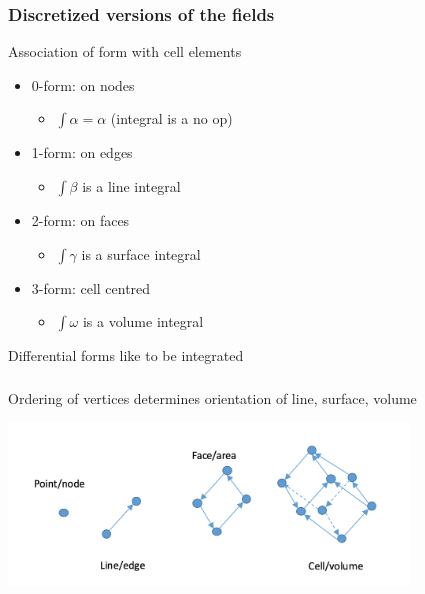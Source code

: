 \documentclass[aspectratio=169]{beamer}
\begin{document}
\begin{frame}[t]
  \frametitle{Discretized versions of the fields}
    \begin{block}{Association of form with cell elements}
      \begin{itemize}%
	  \item 0-form: {\color{red} on nodes}
        \begin{itemize}
          \item $\int \alpha = \alpha$ (integral is a no op)
        \end{itemize}
      \item 1-form: {\color{red} on edges}
        \begin{itemize}
          \item $\int \beta$ is a line integral
        \end{itemize}
      \item 2-form: {\color{red} on faces}
        \begin{itemize}
          \item $\int \gamma$ is a surface integral
        \end{itemize}
      \item 3-form: {\color{red} cell centred}
        \begin{itemize}
          \item $\int \omega$ is a volume integral
        \end{itemize}
    \end{itemize}
  \end{block}
  \begin{block}{Differential forms like to be integrated}
  \end{block}
\end{frame}

\begin{frame}[t]
  \frametitle{}
    \begin{block}{Ordering of vertices determines orientation of line, surface, volume}    
  \begin{center}
    \includegraphics[width=0.8\textwidth]{orientedManifolds.png}
  \end{center}
  \end{block}
\end{frame}
\end{document}
